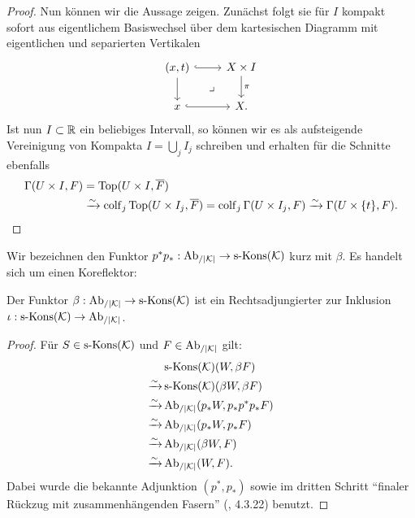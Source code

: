 \begin{proof}
  Nun können wir die Aussage zeigen. Zunächst folgt sie für $I$
  kompakt sofort aus eigentlichem Basiswechsel über dem kartesischen
  Diagramm mit eigentlichen und separierten Vertikalen
  \[ \begin{tikzcd}
    (x, t) \arrow[r, hook] \arrow[d] \arrow[dr, phantom, "\lrcorner"]
    & X \times I \arrow[d, "\pi"] \\
    x \arrow[r, hook]
    & X.
  \end{tikzcd} \]
  Ist nun $I \subset \mathbb{R}$ ein beliebiges Intervall, so können wir es
  als aufsteigende Vereinigung von Kompakta $I = \bigcup_j I_j$
  schreiben und erhalten für die Schnitte ebenfalls
  \begin{align*}
    \Gamma(U \times I, F)
     &= \operatorname{Top}(U \times I, \overline{F}) \\
     &\xrightarrow[]{\sim} \operatorname{colf}\limits_j \operatorname{Top}(U \times I_j, \overline{F})
     = \operatorname{colf}\limits_j \Gamma(U \times I_j, F)
     \xrightarrow[]{\sim} \Gamma(U \times \{t\}, F).
  \end{align*}
\end{proof}

Wir bezeichnen den Funktor $p^*p_*: \operatorname{Ab}_{/|\mathcal{K}|} \to \operatorname{s-Kons}(\mathcal{K})$ kurz mit
$\beta$. Es handelt sich um einen Koreflektor:
\begin{lemma} \label{beta-adjoint}
  Der Funktor $\beta: \operatorname{Ab}_{/|\mathcal{K}|} \to \operatorname{s-Kons}(\mathcal{K})$ ist ein Rechtsadjungierter
  zur Inklusion $\iota: \operatorname{s-Kons}(\mathcal{K}) \to \operatorname{Ab}_{/|\mathcal{K}|}$.
\end{lemma}
\begin{proof}
  Für $S \in \operatorname{s-Kons}(\mathcal{K})$ und $F \in \operatorname{Ab}_{/|\mathcal{K}|}$ gilt:
  \begin{align*}
    & \operatorname{s-Kons}(\mathcal{K})(W, \beta F) \\
    \xrightarrow[]{\sim} & \operatorname{s-Kons}(\mathcal{K})(\beta W, \beta F) \\
    \xrightarrow[]{\sim} & \operatorname{Ab}_{/|\mathcal{K}|}(p_* W, p_* p^* p_* F) \\
    \xrightarrow[]{\sim} & \operatorname{Ab}_{/|\mathcal{K}|}(p_* W, p_* F) \\
    \xrightarrow[]{\sim} & \operatorname{Ab}_{/|\mathcal{K}|}(\beta W, F) \\
    \xrightarrow[]{\sim} & \operatorname{Ab}_{/|\mathcal{K}|}(W, F).
  \end{align*}
  Dabei wurde die bekannte Adjunktion $(p^*, p_*)$ sowie im dritten
  Schritt ``finaler Rückzug mit zusammenhängenden Fasern'' (\cite{TG},
  4.3.22) benutzt.
\end{proof}

